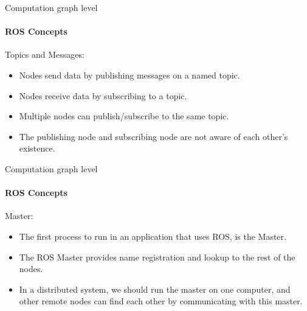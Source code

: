\documentclass{beamer}
\begin{document}
\begin{frame}{Computation graph level}
    \framesubtitle{ROS Concepts}
    {\huge Topics and Messages:}
    \vspace{1cm}
    \begin{itemize}
        \item Nodes send data by publishing messages on a named topic.
        
        \item Nodes receive data by subscribing to a topic.
        
        \item Multiple nodes can publish/subscribe to the same topic.
        
        \item The publishing node and subscribing node are not aware of each other's existence. 
    \end{itemize}
\end{frame}

\begin{frame}{Computation graph level}
    \framesubtitle{ROS Concepts}
    {\huge Master:}
    \vspace{1cm}
    \begin{itemize}
        \item The first process to run in an application that uses ROS, is the Master.
        
        \item The ROS Master provides name registration and lookup to the rest
        of the nodes.
        
        \item In a distributed system, we should run the master on one computer,
        and other remote nodes can find each other by communicating with
        this master.
    \end{itemize}
\end{frame}
\end{document}
